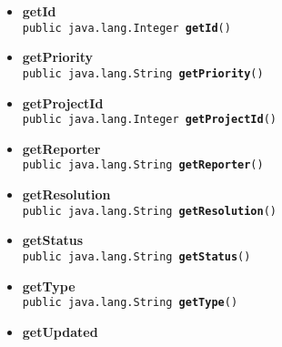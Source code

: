 {{{\begin{itemize}
{{\label{it.unisa.sesa.repominer.db.entities.Issue.getFixVersion()}}%
}%
\item{ 
\hypertarget{it.unisa.sesa.repominer.db.entities.Issue.getId()}{{\bf  getId}\\}
\texttt{public java.lang.Integer\ {\bf  getId}()
\label{it.unisa.sesa.repominer.db.entities.Issue.getId()}}%
}%
\item{ 
\hypertarget{it.unisa.sesa.repominer.db.entities.Issue.getPriority()}{{\bf  getPriority}\\}
\texttt{public java.lang.String\ {\bf  getPriority}()
\label{it.unisa.sesa.repominer.db.entities.Issue.getPriority()}}%
}%
\item{ 
\hypertarget{it.unisa.sesa.repominer.db.entities.Issue.getProjectId()}{{\bf  getProjectId}\\}
\texttt{public java.lang.Integer\ {\bf  getProjectId}()
\label{it.unisa.sesa.repominer.db.entities.Issue.getProjectId()}}%
}%
\item{ 
\hypertarget{it.unisa.sesa.repominer.db.entities.Issue.getReporter()}{{\bf  getReporter}\\}
\texttt{public java.lang.String\ {\bf  getReporter}()
\label{it.unisa.sesa.repominer.db.entities.Issue.getReporter()}}%
}%
\item{ 
\hypertarget{it.unisa.sesa.repominer.db.entities.Issue.getResolution()}{{\bf  getResolution}\\}
\texttt{public java.lang.String\ {\bf  getResolution}()
\label{it.unisa.sesa.repominer.db.entities.Issue.getResolution()}}%
}%
\item{ 
\hypertarget{it.unisa.sesa.repominer.db.entities.Issue.getStatus()}{{\bf  getStatus}\\}
\texttt{public java.lang.String\ {\bf  getStatus}()
\label{it.unisa.sesa.repominer.db.entities.Issue.getStatus()}}%
}%
\item{ 
\hypertarget{it.unisa.sesa.repominer.db.entities.Issue.getType()}{{\bf  getType}\\}
\texttt{public java.lang.String\ {\bf  getType}()
\label{it.unisa.sesa.repominer.db.entities.Issue.getType()}}%
}%
\item{ 
\hypertarget{it.unisa.sesa.repominer.db.entities.Issue.getUpdated()}{{\bf  getUpdated}\\}
}
\end{itemize}}}}
